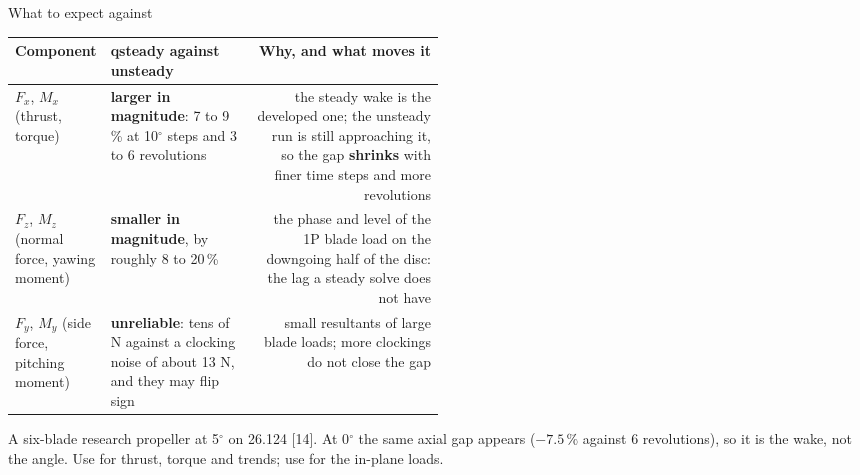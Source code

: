 \begin{frame}{What to expect against }
\relax %
{\ftstablesize\renewcommand{\arraystretch}{1.15}
\begin{tabularx}{\linewidth}{@{}P{0.16\linewidth}P{0.34\linewidth}R@{}}
\toprule
\textbf{Component} & \textbf{qsteady against unsteady} & \textbf{Why, and what moves it} \\
\midrule
\(F_x\), \(M_x\) (thrust, torque) & \textbf{larger in magnitude}: 7 to 9\,\%
  at 10\(^\circ\) steps and 3 to 6 revolutions & the steady wake is the developed
  one; the unsteady run is still approaching it, so the gap
  \textbf{shrinks} with finer time steps and more revolutions \\
\(F_z\), \(M_z\) (normal force, yawing moment) & \textbf{smaller in
  magnitude}, by roughly 8 to 20\,\% & the phase and level of the 1P blade
  load on the downgoing half of the disc: the lag a steady solve does not
  have \\
\(F_y\), \(M_y\) (side force, pitching moment) & \textbf{unreliable}: tens of
  N against a clocking noise of about 13 N, and they may flip sign & small
  resultants of large blade loads; more clockings do not close the gap \\
\bottomrule
\end{tabularx}}
\par\vspace{1mm}
{\scriptsize A six-blade research propeller at 5\(^\circ\) on 26.124 [14]. At
0\(^\circ\) the same axial gap appears (\(-7.5\,\%\) against 6 revolutions),
so it is the wake, not the angle. Use  for thrust,
torque and trends; use  for the in-plane loads.\par}
\end{frame}

